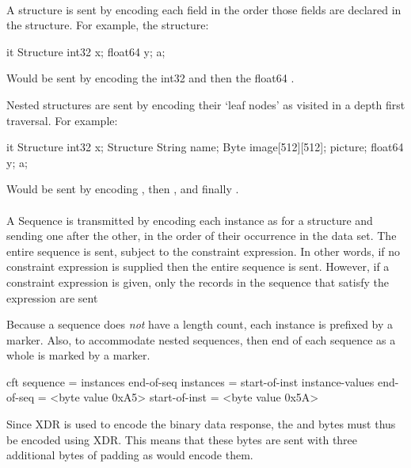 \documentclass[justify]{nasa-ese}
\begin{document}
\paragraph{\Structure}
A structure is sent by encoding each field in the order
  those fields are declared in the structure. For example, the structure:

\begin{vcode}{it}
Structure {
    int32 x;
    float64 y;
} a;
\end{vcode}

Would be sent by encoding the int32  and then the float64
. 

Nested structures are sent by encoding their `leaf nodes' as visited in a
depth first traversal. For example:

\begin{vcode}{it}
Structure {
    int32 x;
    Structure {
        String name;
        Byte image[512][512];
    } picture;
    float64 y;
} a;
\end{vcode}

Would be sent by encoding , then ,  and
finally .

\paragraph{\Sequence}
\label{par:sequence}

A Sequence is transmitted by encoding each instance as for a structure and
sending one after the other, in the order of their occurrence in the data
set. The entire sequence is sent, subject to the constraint expression. In
other words, if no constraint expression is supplied then the entire sequence
is sent. However, if a constraint expression is given, only the records in the
sequence that satisfy the expression are sent

Because a sequence does \emph{not} have a length count, each instance is
prefixed by a  marker. Also, to accommodate nested
sequences, then end of each sequence as a whole is marked by a  marker.

\begin{vcode}{cft}
sequence      = instances end-of-seq 
instances     = start-of-inst instance-values 
end-of-seq    = <byte value 0xA5> 
start-of-inst = <byte value 0x5A> 
\end{vcode}

Since XDR is used to encode the binary data response, the
 and  bytes must thus be
encoded using XDR. This means that these bytes are sent with three
additional bytes of padding as  would encode them.
\end{document}
